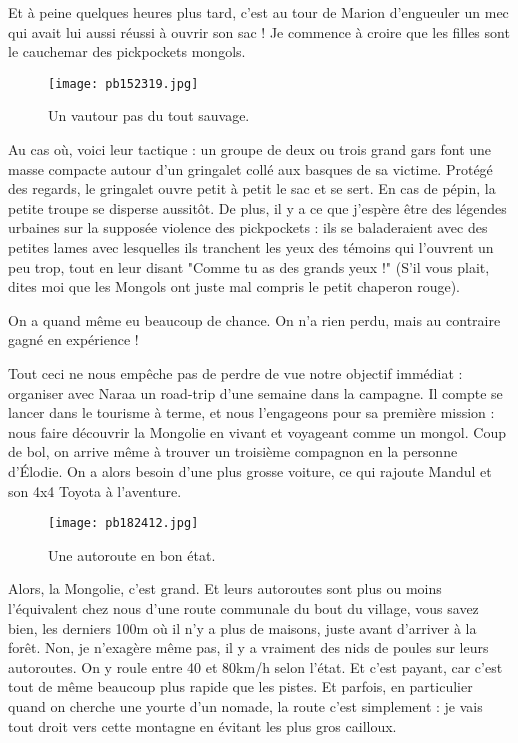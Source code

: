 \documentclass{book}
\begin{document}
Et à peine quelques heures plus tard, c'est au tour de Marion d'engueuler un mec qui avait lui aussi réussi à ouvrir son sac ! Je commence à croire que les filles sont le cauchemar des pickpockets mongols.

\begin{wrapfigure}{l}{0.55\textwidth}
\centering
\texttt{[image: pb152319.jpg]}
\caption*{ Un vautour pas du tout sauvage.}
\end{wrapfigure}


Au cas où, voici leur tactique : un groupe de deux ou trois grand gars font une masse compacte autour d'un gringalet collé aux basques de sa victime. Protégé des regards, le gringalet ouvre petit à petit le sac et se sert. En cas de pépin, la petite troupe se disperse aussitôt. De plus, il y a ce que j'espère être des légendes urbaines sur la supposée violence des pickpockets : ils se baladeraient avec des petites lames avec lesquelles ils tranchent les yeux des témoins qui l'ouvrent un peu trop, tout en leur disant "Comme tu as des grands yeux !" (S'il vous plait, dites moi que les Mongols ont juste mal compris le petit chaperon rouge).

On a quand même eu beaucoup de chance. On n'a rien perdu, mais au contraire gagné en expérience !

Tout ceci ne nous empêche pas de perdre de vue notre objectif immédiat : organiser avec Naraa un road-trip d'une semaine dans la campagne. Il compte se lancer dans le tourisme à terme, et nous l'engageons pour sa première mission : nous faire découvrir la Mongolie en vivant et voyageant comme un mongol. Coup de bol, on arrive même à trouver un troisième compagnon en la personne d’Élodie. On a alors besoin d'une plus grosse voiture, ce qui rajoute Mandul et son 4x4 Toyota à l'aventure.


\begin{figure}[h]
\centering
\texttt{[image: pb182412.jpg]}
\caption*{ Une autoroute en bon état.}
\end{figure}

Alors, la Mongolie, c'est grand. Et leurs autoroutes sont plus ou moins l'équivalent chez nous d'une route communale du bout du village, vous savez bien, les derniers 100m où il n'y a plus de maisons, juste avant d'arriver à la forêt. Non, je n'exagère même pas, il y a vraiment des nids de poules sur leurs autoroutes. On y roule entre 40 et 80km/h selon l'état. Et c'est payant, car c'est tout de même beaucoup plus rapide que les pistes. Et parfois, en particulier quand on cherche une yourte d'un nomade, la route c'est simplement : je vais tout droit vers cette montagne en évitant les plus gros cailloux.
\end{document}

